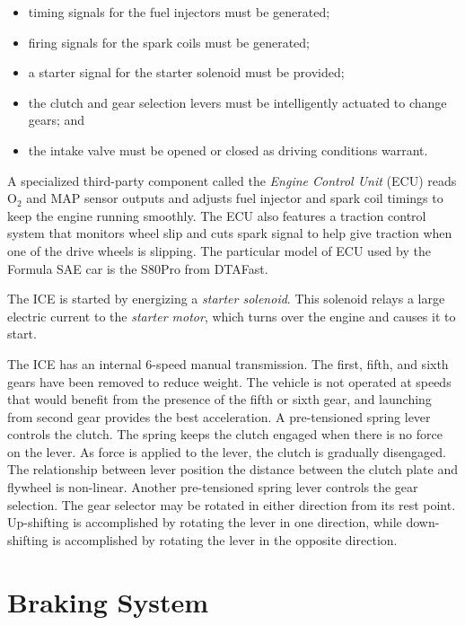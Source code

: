 \begin{itemize}
\item timing signals for the fuel injectors must be generated;
\item firing signals for the spark coils must be generated;  
\item a starter signal for the starter solenoid must be provided;
\item the clutch and gear selection levers must be intelligently actuated to change gears; and
\item the intake valve must be opened or closed as driving conditions warrant.
\end{itemize}

A specialized third-party component called the \emph{Engine Control Unit} (ECU) reads O$_{2}$
and MAP sensor outputs and adjusts fuel injector and spark coil timings to keep the engine running 
smoothly. The ECU also features a traction control system that monitors wheel slip and cuts spark 
signal to help give traction when one of the drive wheels is slipping. The particular model of
ECU used by the Formula SAE car is the S80Pro from DTAFast\cite{s60pro}.

The ICE is started by energizing a \emph{starter solenoid}. This solenoid relays a large electric current 
to the \emph{starter motor}, which turns over the engine and causes it to start. 

The ICE has an internal 6-speed manual transmission. The first, fifth, and sixth gears have been 
removed to reduce weight. The vehicle is not operated at speeds that would benefit from the presence 
of the fifth or sixth gear, and launching from second gear provides the best acceleration. A pre-tensioned 
spring lever controls the clutch. The spring keeps the clutch engaged when there is no force on the lever.
As force is applied to the lever, the clutch is gradually disengaged. The relationship between
lever position the distance between the clutch plate and flywheel is non-linear. Another
pre-tensioned spring lever controls the gear selection. The gear selector may be rotated in either 
direction from its rest point. Up-shifting is accomplished by rotating the lever in one direction, 
while down-shifting is accomplished by rotating the lever in the opposite direction. 

\section{Braking System}

